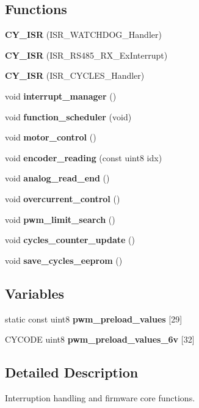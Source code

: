 \subsection*{Functions}
\begin{DoxyCompactItemize}
\item 
\mbox{\label{interruptions_8c_aba74df0c62c62434ebccf8124c5d5fef}} 
{\bfseries C\+Y\+\_\+\+I\+SR} (I\+S\+R\+\_\+\+W\+A\+T\+C\+H\+D\+O\+G\+\_\+\+Handler)
\item 
\mbox{\label{interruptions_8c_a7692d8c3185943c5bdfaa6de0a172ad3}} 
{\bfseries C\+Y\+\_\+\+I\+SR} (I\+S\+R\+\_\+\+R\+S485\+\_\+\+R\+X\+\_\+\+Ex\+Interrupt)
\item 
\mbox{\label{interruptions_8c_a2347671848e5c23aa5df4ce2f2fd869d}} 
{\bfseries C\+Y\+\_\+\+I\+SR} (I\+S\+R\+\_\+\+C\+Y\+C\+L\+E\+S\+\_\+\+Handler)
\item 
void \textbf{ interrupt\+\_\+manager} ()
\item 
void \textbf{ function\+\_\+scheduler} (void)
\item 
void \textbf{ motor\+\_\+control} ()
\item 
void \textbf{ encoder\+\_\+reading} (const uint8 idx)
\item 
void \textbf{ analog\+\_\+read\+\_\+end} ()
\item 
void \textbf{ overcurrent\+\_\+control} ()
\item 
void \textbf{ pwm\+\_\+limit\+\_\+search} ()
\item 
void \textbf{ cycles\+\_\+counter\+\_\+update} ()
\item 
void \textbf{ save\+\_\+cycles\+\_\+eeprom} ()
\end{DoxyCompactItemize}
\subsection*{Variables}
\begin{DoxyCompactItemize}
\item 
static const uint8 {\bfseries pwm\+\_\+preload\+\_\+values} [29]
\item 
\mbox{\label{interruptions_8c_ade15ebab678018bae72c12a91e93a6e5}} 
C\+Y\+C\+O\+DE uint8 {\bfseries pwm\+\_\+preload\+\_\+values\+\_\+6v} [32]
\end{DoxyCompactItemize}


\subsection{Detailed Description}
Interruption handling and firmware core functions. 

